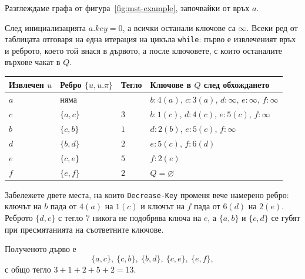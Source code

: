 \begin{example}
Разглеждаме графа от фигура~\ref{fig:mst-example}, започвайки от връх $a$.

\begin{lecfigure}
\end{lecfigure}

След инициализацията $a.\mathit{key}=0$, а всички останали ключове са $\infty$. Всеки ред от таблицата отговаря на една итерация на цикъла \verb|while|: първо е извлеченият връх и реброто, което той внася в дървото, а после ключовете, с които останалите върхове чакат в $Q$.

\begin{center}
\begin{tabular}{llll}
\toprule
Извлечен $u$ & Ребро $\{u,u.\pi\}$ & Тегло & Ключове в $Q$ след обхождането \\
\midrule
$a$ & няма & & $b{:}4(a)$, $c{:}3(a)$, $d{:}\infty$, $e{:}\infty$, $f{:}\infty$ \\
$c$ & $\{a,c\}$ & $3$ & $b{:}1(c)$, $d{:}4(c)$, $e{:}5(c)$, $f{:}\infty$ \\
$b$ & $\{c,b\}$ & $1$ & $d{:}2(b)$, $e{:}5(c)$, $f{:}\infty$ \\
$d$ & $\{b,d\}$ & $2$ & $e{:}5(c)$, $f{:}6(d)$ \\
$e$ & $\{c,e\}$ & $5$ & $f{:}2(e)$ \\
$f$ & $\{e,f\}$ & $2$ & $Q=\varnothing$ \\
\bottomrule
\end{tabular}
\end{center}

Забележете двете места, на които \verb|Decrease-Key| променя вече намерено ребро: ключът на $b$ пада от $4(a)$ на $1(c)$ и ключът на $f$ пада от $6(d)$ на $2(e)$. Реброто $\{d,e\}$ с тегло $7$ никога не подобрява ключа на $e$, а $\{a,b\}$ и $\{c,d\}$ се губят при пресмятанията на съответните ключове.

Полученото дърво е
\[
\{a,c\},\ \{c,b\},\ \{b,d\},\ \{c,e\},\ \{e,f\},
\]
с общо тегло $3+1+2+5+2=13$.
\end{example}


